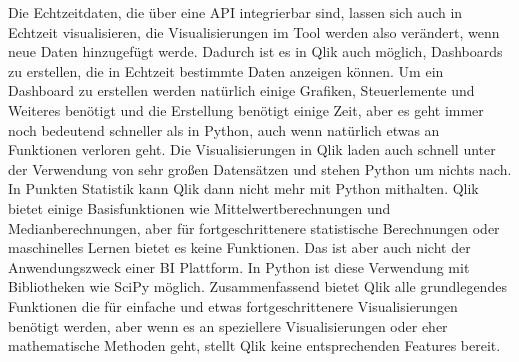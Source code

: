 \documentclass[12pt]{article}
\begin{document}
	Die Echtzeitdaten, die über eine API integrierbar sind, lassen sich auch in Echtzeit visualisieren, die Visualisierungen im Tool werden also verändert, wenn neue Daten hinzugefügt werde. Dadurch ist es in Qlik auch möglich, Dashboards zu erstellen, die in Echtzeit bestimmte Daten anzeigen können. Um ein Dashboard zu erstellen werden natürlich einige Grafiken, Steuerlemente und Weiteres benötigt und die Erstellung benötigt einige Zeit, aber es geht immer noch bedeutend schneller als in Python, auch wenn natürlich etwas an Funktionen verloren geht.
	Die Visualisierungen in Qlik laden auch schnell unter der Verwendung von sehr großen Datensätzen und stehen Python um nichts nach.
	In Punkten Statistik kann Qlik dann nicht mehr mit Python mithalten. Qlik bietet einige Basisfunktionen wie Mittelwertberechnungen und Medianberechnungen, aber für fortgeschrittenere statistische Berechnungen oder maschinelles Lernen bietet es keine Funktionen. Das ist aber auch nicht der Anwendungszweck einer BI Plattform. In Python ist diese Verwendung mit Bibliotheken wie SciPy möglich.
	Zusammenfassend bietet Qlik alle grundlegendes Funktionen die für einfache und etwas fortgeschrittenere Visualisierungen benötigt werden, aber wenn es an speziellere Visualisierungen oder eher mathematische Methoden geht, stellt Qlik keine entsprechenden Features bereit.
	
\end{document}
